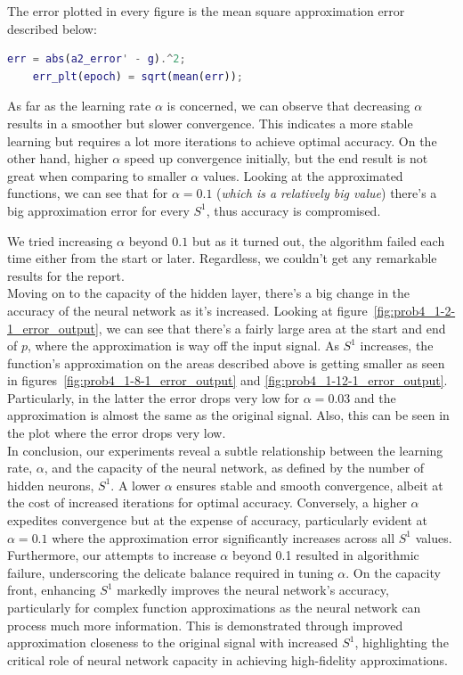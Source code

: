 The error plotted in every figure is the mean square approximation error described below:
\begin{lstlisting}[language=matlab]
	err = abs(a2_error' - g).^2;
	err_plt(epoch) = sqrt(mean(err));
\end{lstlisting}

As far as the learning rate $\alpha$ is concerned, we can observe that decreasing $\alpha$ results in a smoother but slower convergence. This indicates a more stable learning but requires a lot more iterations to achieve optimal accuracy.
On the other hand, higher $\alpha$ speed up convergence initially, but the end result is not great when comparing to smaller $\alpha$ values. Looking at the approximated functions, we can see that for $\alpha=0.1$ (\textit{\small which is a relatively big value}) there's a big approximation error for every $S^1$, thus accuracy is compromised.

We tried increasing $\alpha$ beyond $0.1$ but as it turned out, the algorithm failed each time either from the start or later. Regardless, we couldn't get any remarkable results for the report.\\

Moving on to the capacity of the hidden layer, there's a big change in the accuracy of the neural network as it's increased.
Looking at figure~\ref{fig:prob4_1-2-1_error_output}, we can see that there's a fairly large area at the start and end of $p$, where the approximation is way off the input signal.
As $S^1$ increases, the function's approximation on the areas described above is getting smaller as seen in figures~\ref{fig:prob4_1-8-1_error_output} and \ref{fig:prob4_1-12-1_error_output}. Particularly, in the latter the error drops very low for $\alpha=0.03$ and the approximation is almost the same as the original signal.
Also, this can be seen in the  plot where the error drops very low. \\


In conclusion, our experiments reveal a subtle relationship between the learning rate, $\alpha$, and the capacity of the neural network, as defined by the number of hidden neurons, $S^1$. A lower $\alpha$ ensures stable and smooth convergence, albeit at the cost of increased iterations for optimal accuracy. Conversely, a higher $\alpha$ expedites convergence but at the expense of accuracy, particularly evident at $\alpha=0.1$ where the approximation error significantly increases across all $S^1$ values. Furthermore, our attempts to increase $\alpha$ beyond 0.1 resulted in algorithmic failure, underscoring the delicate balance required in tuning $\alpha$. On the capacity front, enhancing $S^1$ markedly improves the neural network's accuracy, particularly for complex function approximations as the neural network can process much more information. This is demonstrated through improved approximation closeness to the original signal with increased $S^1$, highlighting the critical role of neural network capacity in achieving high-fidelity approximations.